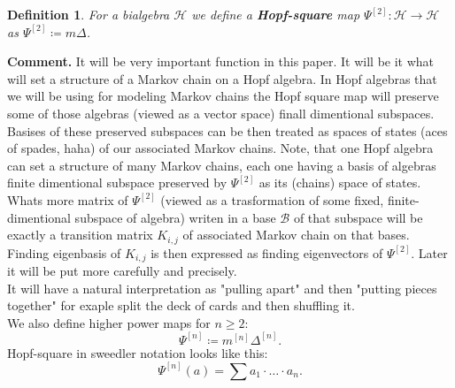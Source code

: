 \documentclass[a4paper, 12pt]{report}
\newtheorem{definition}{Definition}
\begin{document}
\begin{definition}
For a bialgebra $\mathcal{H}$ we define a \textbf{Hopf-square} map
$\Psi^{[2]} : \mathcal{H} \to \mathcal{H}$ as $\Psi^{[2]} \coloneqq m\Delta$.
\end{definition}
\textbf{Comment. } It will be very important function in this paper. It will be it what will set a structure
of a Markov chain on a Hopf algebra. In Hopf algebras that we will
be using for modeling Markov chains the Hopf square map will preserve some of those algebras
(viewed as a vector space) finall dimentional subspaces. Basises of these preserved
subspaces can be then treated as spaces of states (aces of spades, haha)
of our associated Markov chains. Note, that one Hopf algebra can set a structure of many Markov chains,
each one having a basis of algebras finite dimentional subspace preserved by $\Psi^{[2]}$ as its (chains)
space of states.
Whats more matrix of $\Psi^{[2]}$ (viewed as a trasformation of some fixed, finite-dimentional
subspace of algebra)
writen in a base $\mathcal{B}$ of that subspace will be exactly a transition matrix
$K_{i,j}$ of associated Markov chain on that bases. Finding eigenbasis of $K_{i,j}$ is then expressed as
finding eigenvectors of $\Psi^{[2]}$. Later it will be put more carefully and precisely. \\
It will have a natural interpretation as "pulling apart" and then "putting pieces together" for
exaple split the deck of cards and then shuffling it. \\[4pt]
We also define higher power maps for $n \geq 2$:
\begin{equation*}
\Psi^{[n]} \coloneqq m^{[n]}\Delta^{[n]}.
\end{equation*}
Hopf-square in sweedler notation looks like this:
\begin{equation*}
\Psi^{[n]}(a) = \sum a_1 \cdot \ldots \cdot a_n.
\end{equation*}
\end{document}
